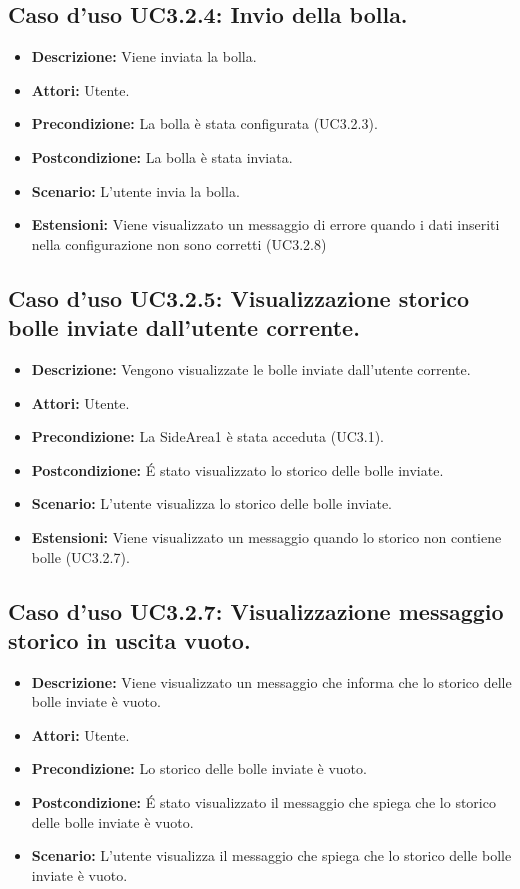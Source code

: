 \subsection{Caso d'uso UC3.2.4: Invio della bolla.}
\begin{itemize}
\item[]\textbf{Descrizione:} Viene inviata la bolla.
\item[]\textbf{Attori:} Utente. 
\item[]\textbf{Precondizione:} La bolla è stata configurata (UC3.2.3). 
\item[]\textbf{Postcondizione:} La bolla è stata inviata. 
\item[]\textbf{Scenario:}
L'utente invia la bolla. 
\item[]\textbf{Estensioni:}
Viene visualizzato un messaggio di errore quando i dati inseriti nella configurazione non sono corretti (UC3.2.8) 
\end{itemize}

\subsection{Caso d'uso UC3.2.5: Visualizzazione storico bolle inviate dall'utente corrente.}
\begin{itemize}
\item[]\textbf{Descrizione:} Vengono visualizzate le bolle inviate dall'utente corrente.
\item[]\textbf{Attori:} Utente. 
\item[]\textbf{Precondizione:} La SideArea1 è stata acceduta (UC3.1). 
\item[]\textbf{Postcondizione:} \'E stato visualizzato lo storico delle bolle inviate. 
\item[]\textbf{Scenario:}
L'utente visualizza lo storico delle bolle inviate. 
\item[]\textbf{Estensioni:}
Viene visualizzato un messaggio quando lo storico non contiene bolle (UC3.2.7). 
\end{itemize}

\subsection{Caso d'uso UC3.2.7: Visualizzazione messaggio storico in uscita vuoto.}
\begin{itemize}
\item[]\textbf{Descrizione:} Viene visualizzato un messaggio che informa che lo storico delle bolle inviate è vuoto.
\item[]\textbf{Attori:} Utente. 
\item[]\textbf{Precondizione:} Lo storico delle bolle inviate è vuoto. 
\item[]\textbf{Postcondizione:} \'E stato visualizzato il messaggio che spiega che lo storico delle bolle inviate è vuoto. 
\item[]\textbf{Scenario:}
L'utente visualizza il messaggio che spiega che lo storico delle bolle inviate è vuoto. 
\end{itemize}

